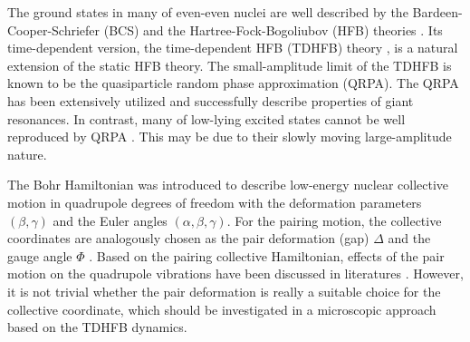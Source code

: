 \documentclass[%
superscriptaddress,
preprint,
showpacs,
nofootinbib,
amsmath,amssymb,
prc,
floatfix ]%
{revtex4-1}
\begin{document}
The ground states in many of even-even nuclei are well
described by the Bardeen-Cooper-Schriefer (BCS)
and the Hartree-Fock-Bogoliubov (HFB) theories \cite{RS80,BHR03}.
Its time-dependent version, 
the time-dependent HFB (TDHFB) theory \cite{BR86,NMMY16},
is a natural extension of the static HFB theory.
The small-amplitude limit of the TDHFB is known to be 
the quasiparticle random phase approximation (QRPA).
The QRPA has been extensively utilized and successfully
describe properties of giant resonances.
In contrast, many of low-lying excited states
cannot be well reproduced by QRPA \cite{NMMY16}.
This may be due to their slowly moving large-amplitude nature.


The Bohr Hamiltonian was introduced to describe low-energy
nuclear collective motion in quadrupole degrees of freedom with
the deformation parameters $(\beta, \gamma)$ and the Euler angles
$(\alpha,\beta,\gamma)$.
For the pairing motion, the collective coordinates are analogously
chosen as the pair deformation (gap) $\Delta$ and the gauge angle $\Phi$
\cite{BBPK70}.
Based on the pairing collective Hamiltonian, 
effects of the pair motion on the quadrupole vibrations %
have been discussed in literatures \cite{delta1,delta3}.
However, it is not trivial whether the pair deformation is really a suitable
choice for the collective coordinate,
which should be investigated in a microscopic approach based on
the TDHFB dynamics.
\end{document}
